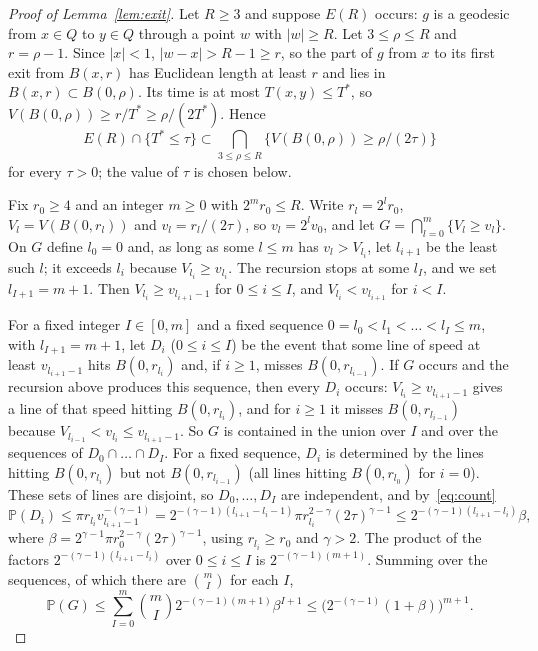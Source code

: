 \documentclass[11pt]{amsart}
\theoremstyle{remark}
\newcommand{\Prob}{\mathbb{P}}
\begin{document}
\begin{proof}[Proof of Lemma~\ref{lem:exit}]
Let $R\ge3$ and suppose $E(R)$ occurs: $g$ is a geodesic from $x\in Q$ to $y\in Q$ through a point $w$ with $|w|\ge
R$. Let $3\le\rho\le R$ and $r=\rho-1$. Since $|x|<1$, $|w-x|>R-1\ge r$, so the part of $g$ from $x$ to its first exit
from $B(x,r)$ has Euclidean length at least $r$ and lies in $B(x,r)\subset B(0,\rho)$. Its time is at most $T(x,y)\le
T^*$, so $V(B(0,\rho))\ge r/T^*\ge\rho/(2T^*)$. Hence
\begin{equation}\label{eq:constraint}
E(R)\cap\{T^*\le\tau\}\subset\bigcap_{3\le\rho\le R}\bigl\{V(B(0,\rho))\ge\rho/(2\tau)\bigr\}
\end{equation}
for every $\tau>0$; the value of $\tau$ is chosen below.

Fix $r_0\ge4$ and an integer $m\ge0$ with $2^mr_0\le R$. Write $r_l=2^lr_0$, $V_l=V(B(0,r_l))$ and
$v_l=r_l/(2\tau)$, so $v_l=2^lv_0$, and let $G=\bigcap_{l=0}^m\{V_l\ge v_l\}$. On $G$ define $l_0=0$ and, as long as
some $l\le m$ has $v_l>V_{l_i}$, let $l_{i+1}$ be the least such $l$; it exceeds $l_i$ because $V_{l_i}\ge v_{l_i}$.
The recursion stops at some $l_I$, and we set $l_{I+1}=m+1$. Then $V_{l_i}\ge v_{l_{i+1}-1}$ for $0\le i\le I$, and
$V_{l_i}<v_{l_{i+1}}$ for $i<I$.

For a fixed integer $I\in[0,m]$ and a fixed sequence $0=l_0<l_1<\dots<l_I\le m$, with $l_{I+1}=m+1$, let $D_i$
($0\le i\le I$) be the event that some line of speed at least $v_{l_{i+1}-1}$ hits $B(0,r_{l_i})$ and, if $i\ge1$,
misses $B(0,r_{l_{i-1}})$. If $G$ occurs and the recursion above produces this sequence, then every $D_i$ occurs:
$V_{l_i}\ge v_{l_{i+1}-1}$ gives a line of that speed hitting $B(0,r_{l_i})$, and for $i\ge1$ it misses
$B(0,r_{l_{i-1}})$ because $V_{l_{i-1}}<v_{l_i}\le v_{l_{i+1}-1}$. So $G$ is contained in the union over $I$ and over
the sequences of $D_0\cap\dots\cap D_I$. For a fixed sequence, $D_i$ is determined by the lines hitting
$B(0,r_{l_i})$ but not $B(0,r_{l_{i-1}})$ (all lines hitting $B(0,r_{l_0})$ for $i=0$). These sets of lines are
disjoint, so $D_0,\dots,D_I$ are independent, and by~\eqref{eq:count}
\[
\Prob(D_i)\le\pi r_{l_i}v_{l_{i+1}-1}^{-(\gamma-1)}
=2^{-(\gamma-1)(l_{i+1}-l_i-1)}\pi r_{l_i}^{2-\gamma}(2\tau)^{\gamma-1}
\le2^{-(\gamma-1)(l_{i+1}-l_i)}\beta,
\]
where $\beta=2^{\gamma-1}\pi r_0^{2-\gamma}(2\tau)^{\gamma-1}$, using $r_{l_i}\ge r_0$ and $\gamma>2$. The product of
the factors $2^{-(\gamma-1)(l_{i+1}-l_i)}$ over $0\le i\le I$ is $2^{-(\gamma-1)(m+1)}$. Summing over the sequences, of
which there are $\binom mI$ for each $I$,
\[
\Prob(G)\le\sum_{I=0}^m\binom mI2^{-(\gamma-1)(m+1)}\beta^{I+1}\le\bigl(2^{-(\gamma-1)}(1+\beta)\bigr)^{m+1}.
\]


\end{proof}
\end{document}
